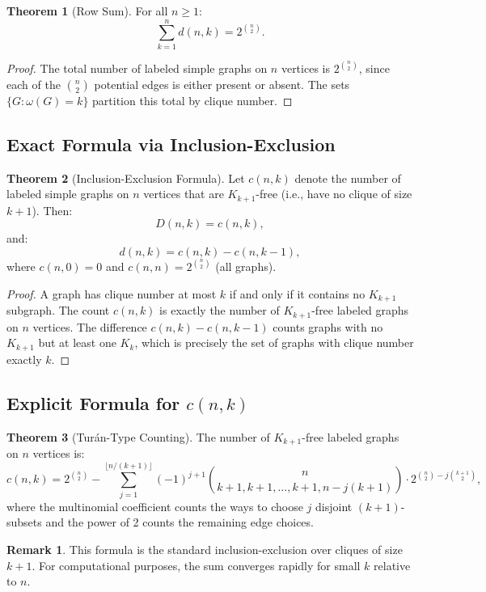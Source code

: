\documentclass[11pt,a4paper]{article}
\theoremstyle{definition}
\newtheorem{theorem}{Theorem}[section]
\newtheorem{remark}{Remark}[section]
\begin{document}
\begin{theorem}[Row Sum]
For all $n \geq 1$:
\[
\sum_{k=1}^{n} d(n, k) = 2^{\binom{n}{2}}.
\]
\end{theorem}

\begin{proof}
The total number of labeled simple graphs on $n$ vertices is $2^{\binom{n}{2}}$, since each of the $\binom{n}{2}$ potential edges is either present or absent. The sets $\{G : \omega(G) = k\}$ partition this total by clique number.
\end{proof}

\subsection{Exact Formula via Inclusion-Exclusion}

\begin{theorem}[Inclusion-Exclusion Formula]
Let $c(n, k)$ denote the number of labeled simple graphs on $n$ vertices that are $K_{k+1}$-free (i.e., have no clique of size $k+1$). Then:
\[
D(n, k) = c(n, k),
\]
and:
\[
d(n, k) = c(n, k) - c(n, k-1),
\]
where $c(n, 0) = 0$ and $c(n, n) = 2^{\binom{n}{2}}$ (all graphs).
\end{theorem}

\begin{proof}
A graph has clique number at most $k$ if and only if it contains no $K_{k+1}$ subgraph. The count $c(n, k)$ is exactly the number of $K_{k+1}$-free labeled graphs on $n$ vertices. The difference $c(n, k) - c(n, k-1)$ counts graphs with no $K_{k+1}$ but at least one $K_k$, which is precisely the set of graphs with clique number exactly $k$.
\end{proof}

\subsection{Explicit Formula for $c(n, k)$}

\begin{theorem}[Tur\'an-Type Counting]
The number of $K_{k+1}$-free labeled graphs on $n$ vertices is:
\[
c(n, k) = 2^{\binom{n}{2}} - \sum_{j=1}^{\lfloor n/(k+1) \rfloor} (-1)^{j+1} \binom{n}{k+1, k+1, \ldots, k+1, n - j(k+1)} \cdot 2^{\binom{n}{2} - j\binom{k+1}{2}},
\]
where the multinomial coefficient counts the ways to choose $j$ disjoint $(k+1)$-subsets and the power of 2 counts the remaining edge choices.
\end{theorem}

\begin{remark}
This formula is the standard inclusion-exclusion over cliques of size $k+1$. For computational purposes, the sum converges rapidly for small $k$ relative to $n$.
\end{remark}
\end{document}
